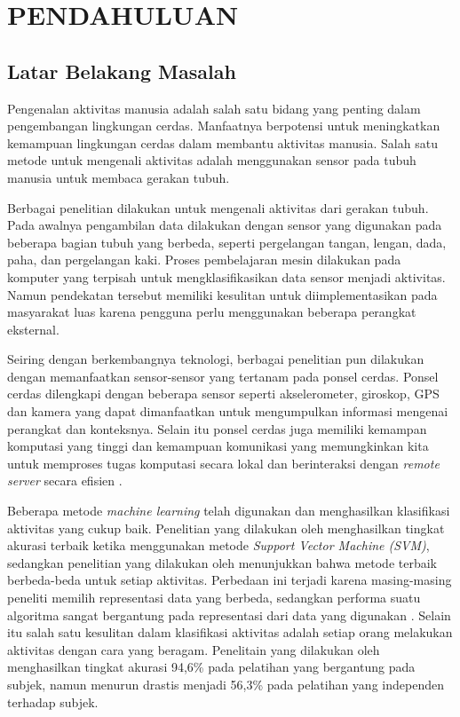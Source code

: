\chapter{PENDAHULUAN}

\section{Latar Belakang Masalah}
Pengenalan aktivitas manusia adalah salah satu bidang yang penting dalam pengembangan lingkungan cerdas. Manfaatnya berpotensi untuk meningkatkan kemampuan lingkungan cerdas dalam membantu aktivitas manusia. Salah satu metode untuk mengenali aktivitas adalah menggunakan sensor pada tubuh manusia untuk membaca gerakan tubuh.

Berbagai penelitian dilakukan untuk mengenali aktivitas dari gerakan tubuh. Pada awalnya pengambilan data dilakukan dengan sensor yang digunakan pada beberapa bagian tubuh yang berbeda, seperti pergelangan tangan, lengan, dada, paha, dan pergelangan kaki. Proses pembelajaran mesin dilakukan pada komputer yang terpisah untuk mengklasifikasikan data sensor menjadi aktivitas. Namun pendekatan tersebut memiliki kesulitan untuk diimplementasikan pada masyarakat luas karena pengguna perlu menggunakan beberapa perangkat eksternal.

Seiring dengan berkembangnya teknologi, berbagai penelitian pun dilakukan dengan memanfaatkan sensor-sensor yang tertanam pada ponsel cerdas. Ponsel cerdas dilengkapi dengan beberapa sensor seperti akselerometer, giroskop, GPS dan kamera yang dapat dimanfaatkan untuk mengumpulkan informasi mengenai perangkat dan konteksnya. Selain itu ponsel cerdas juga memiliki kemampan komputasi yang tinggi dan kemampuan komunikasi yang memungkinkan kita untuk memproses tugas komputasi secara lokal dan berinteraksi dengan \textit{remote server} secara efisien \citep{wang-2016}.

Beberapa metode \textit{machine learning} telah digunakan dan menghasilkan klasifikasi aktivitas yang cukup baik. Penelitian yang dilakukan oleh \citet{Chiang-201413} menghasilkan tingkat akurasi terbaik ketika menggunakan metode \textit{Support Vector Machine (SVM)}, sedangkan penelitian yang dilakukan oleh \citet{shoaib-2013} menunjukkan bahwa metode terbaik berbeda-beda untuk setiap aktivitas. Perbedaan ini terjadi karena masing-masing peneliti memilih representasi data yang berbeda, sedangkan performa suatu algoritma sangat bergantung pada representasi dari data yang digunakan \citep{goodfellow-2016}. Selain itu salah satu kesulitan dalam klasifikasi aktivitas adalah setiap orang melakukan aktivitas dengan cara yang beragam. Penelitain yang dilakukan oleh \citet{tapia-2007} menghasilkan tingkat akurasi 94,6\% pada pelatihan yang bergantung pada subjek, namun menurun drastis menjadi 56,3\% pada pelatihan yang independen terhadap subjek.

